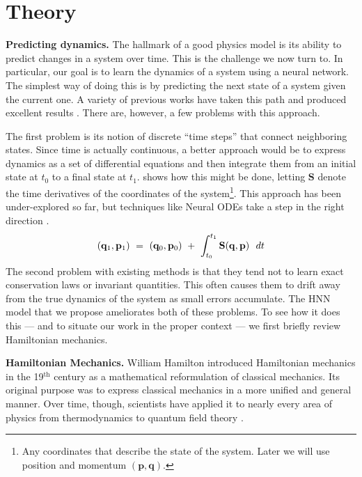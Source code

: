 \documentclass{article}
\begin{document}
\section{Theory} 

\textbf{Predicting dynamics.} The hallmark of a good physics model is its ability to predict changes in a system over time. This is the challenge we now turn to. In particular, our goal is to learn the dynamics of a system using a neural network. The simplest way of doing this is by predicting the next state of a system given the current one. A variety of previous works have taken this path and produced excellent results \cite{tompson2017accelerating, grzeszczuk2000neuroanimator, Watters2017Visual, Santoro2017Simple, Hamrick2018Relational, chang2016compositional}. There are, however, a few problems with this approach.

The first problem is its notion of discrete ``time steps'' that connect neighboring states. Since time is actually continuous, a better approach would be to express dynamics as a set of differential equations and then integrate them from an initial state at $t_0$ to a final state at $t_1$.  shows how this might be done, letting $\mathbf{S}$ denote the time derivatives of the coordinates of the system\footnote{Any coordinates that describe the state of the system. Later we will use position and momentum $(\textbf{p},\textbf{q})$.}. This approach has been under-explored so far, but techniques like Neural ODEs take a step in the right direction \cite{Chen2018NeuralEquations}.
\begin{equation}
(\mathbf{q}_1,\mathbf{p}_1) ~=~ (\mathbf{q}_0,\mathbf{p}_0) ~+~ \int_{t_0}^{t_1} \mathbf{S}(\mathbf{q},\mathbf{p}) ~~ dt
\eqnlabel{eqn1}
\end{equation}
The second problem with existing methods is that they tend not to learn exact conservation laws or invariant quantities. This often causes them to drift away from the true dynamics of the system as small errors accumulate. The HNN model that we propose ameliorates both of these problems. To see how it does this --- and to situate our work in the proper context ---
we first briefly review Hamiltonian mechanics.

\textbf{Hamiltonian Mechanics.} William Hamilton introduced Hamiltonian mechanics in the 19$^{\textrm{th}}$ century as a mathematical reformulation of classical mechanics. Its original purpose was to express classical mechanics in a more unified and general manner. Over time, though, scientists have applied it to nearly every area of physics from thermodynamics to quantum field theory \cite{reichl1999modern, sakurai1995modern, taylor2005classical}.
\end{document}
